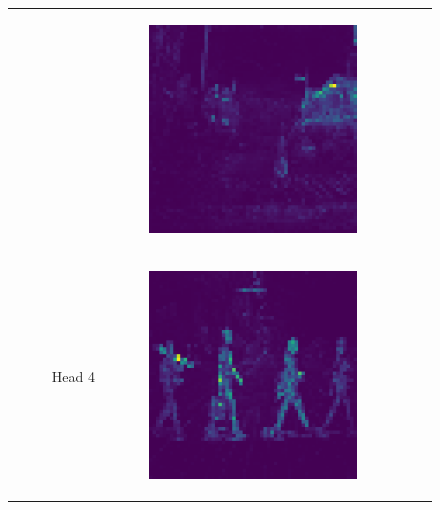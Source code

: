 \begin{figure}
\begin{tabular}{r p{\horspace} p{\horspace} p{\horspace}}
\begin{subfigure}[b]{\subfigwidth}
    \end{subfigure} 
    \hfill &
    \begin{subfigure}[b]{\subfigwidth}
        \includegraphics[width=\subfigwidth]{images/vit_attention/4/attn-head2.png}
    \end{subfigure} \\
    Head 4 &
    \begin{subfigure}[b]{\subfigwidth}
        \includegraphics[width=\subfigwidth]{images/vit_attention/1/attn-head3.png}

\end{subfigure}
\end{tabular}
\end{figure}
